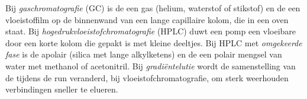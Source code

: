 \begin{definition}\label{def:b2:chromatography:techniques}
Bij \emph{gaschromatografie} (GC) is de  een gas (helium, waterstof
of stikstof) en de  een vloeistoffilm op de binnenwand van een lange capillaire kolom, die
in een oven staat. Bij \emph{hogedrukvloeistofchromatografie}
(HPLC) duwt een pomp een vloeibare  door een korte kolom die gepakt is met kleine
deeltjes. Bij HPLC met \emph{omgekeerde fase} is de  apolair
(silica met lange alkylketens) en de  een polair mengsel van water met methanol of
acetonitril. Bij \emph{gradiëntelutie} wordt de samenstelling van de 
tijdens de run veranderd, bij vloeistofchromatografie, om sterk weerhouden verbindingen sneller te elueren.
\end{definition}

